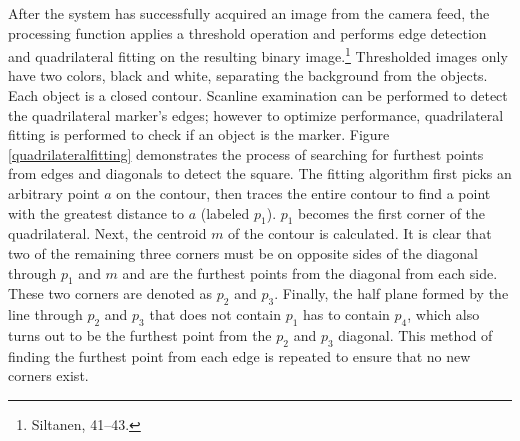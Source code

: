 \begin{figure}[!ht]
\end{figure}

After the system has successfully acquired an image from the camera feed, the processing function applies a threshold operation and performs edge detection and quadrilateral fitting on the resulting binary image.\footnote{Siltanen, 41–43.} Thresholded images only have two colors, black and white, separating the background from the objects. Each object is a closed contour. Scanline examination can be performed to detect the quadrilateral marker's edges; however to optimize performance, quadrilateral fitting is performed to check if an object is the marker. Figure \ref{quadrilateralfitting} demonstrates the process of searching for furthest points from edges and diagonals to detect the square. The fitting algorithm first picks an arbitrary point $a$ on the contour, then traces the entire contour to find a point with the greatest distance to $a$ (labeled $p_1$). $p_1$ becomes the first corner of the quadrilateral. Next, the centroid $m$ of the contour is calculated. It is clear that two of the remaining three corners must be on opposite sides of the diagonal through $p_1$ and $m$ and are the furthest points from the diagonal from each side. These two corners are denoted as $p_2$ and $p_3$. Finally, the half plane formed by the line through $p_2$ and $p_3$ that does not contain $p_1$ has to contain $p_4$, which also turns out to be the furthest point from the $p_2$ and $p_3$ diagonal. This method of finding the furthest point from each edge is repeated to ensure that no new corners exist.

\begin{figure}[!ht]
\end{figure}

